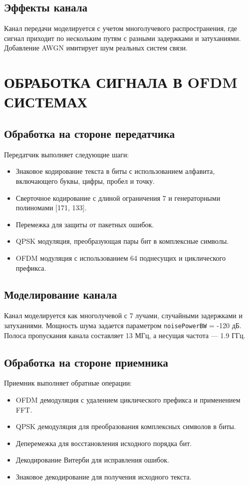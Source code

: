 \documentclass[a4paper,14pt,oneside,openany]{memoir}
\begin{document}
	\section{Эффекты канала}
	
	Канал передачи моделируется с учетом многолучевого распространения, где сигнал приходит по нескольким путям с разными задержками и затуханиями. Добавление AWGN имитирует шум реальных систем связи.
	
	\chapter{ОБРАБОТКА СИГНАЛА В OFDM СИСТЕМАХ}
	
	\section{Обработка на стороне передатчика}
	
	Передатчик выполняет следующие шаги:
	\begin{itemize}
		\item Знаковое кодирование текста в биты с использованием алфавита, включающего буквы, цифры, пробел и точку.
		\item Сверточное кодирование с длиной ограничения 7 и генераторными полиномами [171, 133].
		\item Перемежка для защиты от пакетных ошибок.
		\item QPSK модуляция, преобразующая пары бит в комплексные символы.
		\item OFDM модуляция с использованием 64 поднесущих и циклического префикса.
	\end{itemize}
	
	\section{Моделирование канала}
	
	Канал моделируется как многолучевой с 7 лучами, случайными задержками и затуханиями. Мощность шума задается параметром \texttt{noisePowerBW} = -120 дБ. Полоса пропускания канала составляет 13 МГц, а несущая частота --- 1.9 ГГц.
	
	\section{Обработка на стороне приемника}
	
	Приемник выполняет обратные операции:
	\begin{itemize}
		\item OFDM демодуляция с удалением циклического префикса и применением FFT.
		\item QPSK демодуляция для преобразования комплексных символов в биты.
		\item Деперемежка для восстановления исходного порядка бит.
		\item Декодирование Витерби для исправления ошибок.
		\item Знаковое декодирование для получения исходного текста.
	\end{itemize}
	
\end{document}
